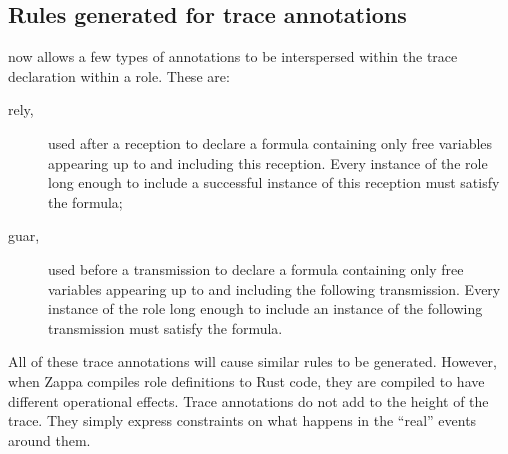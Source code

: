 \subsection{Rules generated for trace annotations}
\label{sec:goals:rules:gen:trace}
%
{\cpsa} now allows a few types of annotations to be interspersed
within the trace declaration within a role.  These are:
%
\begin{description}
  \item[rely,]  used after a reception to
  declare a formula containing only free variables appearing up to and
  including this reception.  Every instance of the role long enough to
  include a successful instance of this reception must satisfy the
  formula;
  \item[guar,]  used before a
  transmission to declare a formula containing only free variables
  appearing up to and including the following transmission.  Every
  instance of the role long enough to include an instance of the
  following transmission must satisfy the formula.
\end{description}
%
All of these trace annotations will cause similar rules to be
generated.  However, when Zappa compiles role definitions to Rust
code, they are compiled to have different operational effects.  Trace
annotations do not add to the height of the trace.  They simply
express constraints on what happens in the ``real'' events around
them.

